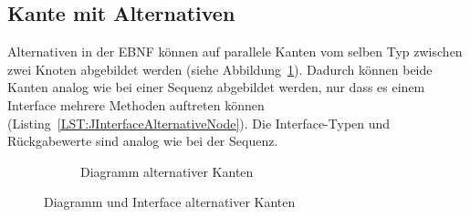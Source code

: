 \documentclass[../InterneDSLs.tex]{subfiles}
\begin{document}
\subsection{Kante mit Alternativen}
Alternativen in der EBNF können auf parallele Kanten vom selben Typ zwischen zwei Knoten abgebildet werden (siehe Abbildung~\ref{FIG:DiagramAlternativeNode}). Dadurch können beide Kanten analog wie bei einer Sequenz abgebildet werden, nur dass es einem Interface mehrere Methoden auftreten können (Listing~\ref{LST:JInterfaceAlternativeNode}). Die Interface-Typen und Rückgabewerte sind analog wie bei der Sequenz.
\begin{figure}[ht]
\centering
  \begin{subfigure}[c]{0.49\textwidth}
    \caption{Diagramm alternativer Kanten}
    \label{FIG:DiagramAlternativeNode}
  \end{subfigure}
  \begin{subfigure}[c]{0.49\textwidth}
    
  \end{subfigure}
  \caption{Diagramm und Interface alternativer Kanten}
  \label{FIG:AlternativeNode}
\end{figure}
\end{document}
